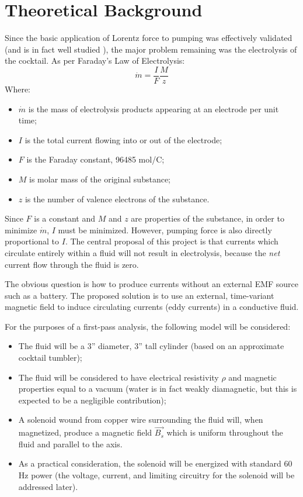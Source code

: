 \documentclass[]{article}
\begin{document}
\section{Theoretical Background}
\par Since the basic application of Lorentz force to pumping was effectively validated (and is in fact well studied \cite{yamato}), the major problem remaining was the electrolysis of the cocktail. As per Faraday's Law of Electrolysis:
\begin{equation}
\dot{m}=\frac{I}{F}\frac{M}{z}
\end{equation}
Where:
\begin{itemize}
	\item $\dot{m}$ is the mass of electrolysis products appearing at an electrode per unit time;
	\item $I$ is the total current flowing into or out of the electrode;
	\item $F$ is the Faraday constant, 96485 mol/C;
	\item $M$ is molar mass of the original substance;
	\item $z$ is the number of valence electrons of the substance.
\end{itemize}
\par Since $F$ is a constant and $M$ and $z$ are properties of the substance, in order to minimize $\dot{m}$, $I$ must be minimized. However, pumping force is also directly proportional to $I$. The central proposal of this project is that currents which circulate entirely within a fluid will not result in electrolysis, because the \textit{net} current flow through the fluid is zero. 
\par The obvious question is how to produce currents without an external EMF source such as a battery. The proposed solution is to use an external, time-variant magnetic field to induce circulating currents (eddy currents) in a conductive fluid.

\par For the purposes of a first-pass analysis, the following model will be considered:
\begin{itemize}
	\item The fluid will be a 3'' diameter, 3'' tall cylinder (based on an approximate cocktail tumbler);
	\item The fluid will be considered to have electrical resistivity $\rho$ and magnetic properties equal to a vacuum (water is in fact weakly diamagnetic, but this is expected to be a negligible contribution);
	\item A solenoid wound from copper wire surrounding the fluid will, when magnetized, produce a magnetic field $\vec{B_s}$ which is uniform throughout the fluid and parallel to the axis.
	\item As a practical consideration, the solenoid will be energized with standard 60 Hz power (the voltage, current, and limiting circuitry for the solenoid will be addressed later).
\end{itemize}
\end{document}
